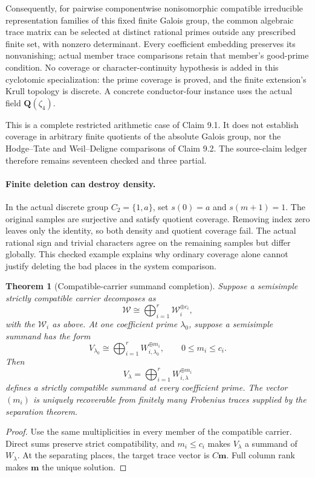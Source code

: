\documentclass[11pt]{article}
\newtheorem{theorem}{Theorem}[section]
\theoremstyle{definition}
\theoremstyle{remark}
\newcommand{\Q}{\mathbf Q}
\begin{document}
Consequently, for pairwise componentwise nonisomorphic compatible irreducible
representation families of this fixed finite Galois group, the common algebraic
trace matrix can be selected at distinct rational primes outside any prescribed
finite set, with nonzero determinant. Every coefficient embedding preserves its
nonvanishing; actual member trace comparisons retain that member's good-prime
condition. No coverage or character-continuity hypothesis is added in this
cyclotomic specialization: the prime coverage is proved, and the finite
extension's Krull topology is discrete. A concrete conductor-four instance uses
the actual field $\Q(\zeta_4)$.

This is a complete restricted arithmetic case of Claim 9.1. It does not establish
coverage in arbitrary finite quotients of the absolute Galois group, nor the
Hodge--Tate and Weil--Deligne comparisons of Claim 9.2. The source-claim ledger
therefore remains seventeen checked and three partial.

\paragraph{Finite deletion can destroy density.}
In the actual discrete group $C_2=\{1,a\}$, set $s(0)=a$ and $s(m+1)=1$.
The original samples are surjective and satisfy quotient coverage. Removing
index zero leaves only the identity, so both density and quotient coverage fail.
The actual rational sign and trivial characters agree on the remaining samples
but differ globally. This checked example explains why ordinary coverage alone
cannot justify deleting the bad places in the system comparison.

\begin{theorem}[Compatible-carrier summand completion]
Suppose a semisimple strictly compatible carrier decomposes as
\[
\mathscr W
\cong
\bigoplus_{i=1}^{r}
\mathscr W_i^{\oplus c_i},
\]
with the \(\mathscr W_i\) as above.  At one coefficient prime \(\lambda_0\), suppose a semisimple summand has the form
\[
V_{\lambda_0}
\cong
\bigoplus_{i=1}^{r}
W_{i,\lambda_0}^{\oplus m_i},
\qquad
0\le m_i\le c_i.
\]
Then
\[
\boxed{
V_\lambda
=
\bigoplus_{i=1}^{r}
W_{i,\lambda}^{\oplus m_i}
}
\]
defines a strictly compatible summand at every coefficient prime.  The vector \((m_i)\) is uniquely recoverable from finitely many Frobenius traces supplied by the separation theorem.
\end{theorem}

\begin{proof}
Use the same multiplicities in every member of the compatible carrier.  Direct sums preserve strict compatibility, and \(m_i\le c_i\) makes \(V_\lambda\) a summand of \(W_\lambda\).  At the separating places, the target trace vector is \(C\bm m\).  Full column rank makes \(\bm m\) the unique solution.
\end{proof}
\end{document}

